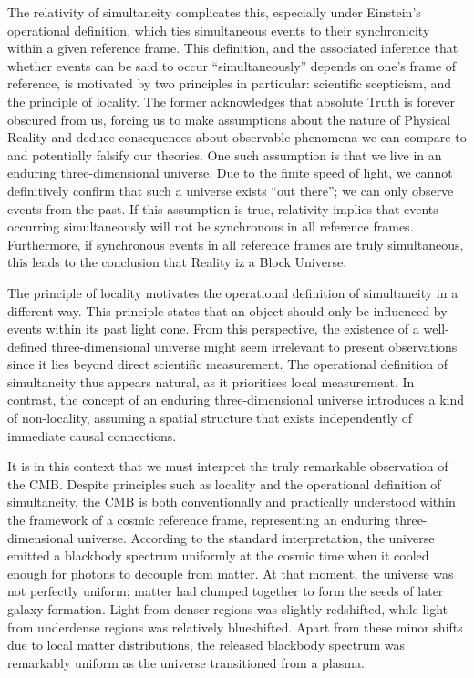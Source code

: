 \documentclass[aps,rmp,groupedaddress,twocolumn,10pt]{revtex4-2}
\begin{document}
The relativity of simultaneity complicates this, especially under Einstein's operational definition, which ties simultaneous events to their synchronicity within a given reference frame. This definition, and the associated inference that whether events can be said to occur ``simultaneously'' depends on one's frame of reference, is motivated by two principles in particular: scientific scepticism, and the principle of locality. The former acknowledges that absolute Truth is forever obscured from us, forcing us to make assumptions about the nature of Physical Reality and deduce consequences about observable phenomena we can compare to and potentially falsify our theories. One such assumption is that we live in an enduring three-dimensional universe. Due to the finite speed of light, we cannot definitively confirm that such a universe exists ``out there''; we can only observe events from the past. If this assumption is true, relativity implies that events occurring simultaneously will not be synchronous in all reference frames. Furthermore, if synchronous events in all reference frames are truly simultaneous, this leads to the conclusion that Reality iz a Block Universe.

The principle of locality motivates the operational definition of simultaneity in a different way. This principle states that an object should only be influenced by events within its past light cone. From this perspective, the existence of a well-defined three-dimensional universe might seem irrelevant to present observations since it lies beyond direct scientific measurement. The operational definition of simultaneity thus appears natural, as it prioritises local measurement. In contrast, the concept of an enduring three-dimensional universe introduces a kind of non-locality, assuming a spatial structure that exists independently of immediate causal connections.

It is in this context that we must interpret the truly remarkable observation of the CMB. Despite principles such as locality and the operational definition of simultaneity, the CMB is both conventionally and practically understood within the framework of a cosmic reference frame, representing an enduring three-dimensional universe. According to the standard interpretation, the universe emitted a blackbody spectrum uniformly at the cosmic time when it cooled enough for photons to decouple from matter. At that moment, the universe was not perfectly uniform; matter had clumped together to form the seeds of later galaxy formation. Light from denser regions was slightly redshifted, while light from underdense regions was relatively blueshifted. Apart from these minor shifts due to local matter distributions, the released blackbody spectrum was remarkably uniform as the universe transitioned from a plasma.
\end{document}
